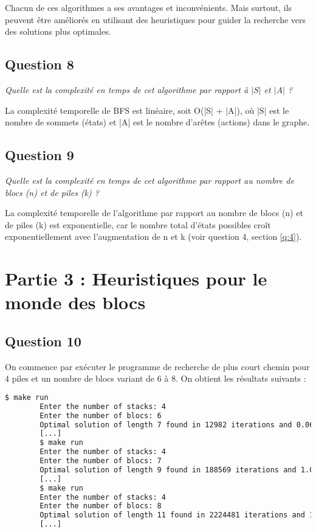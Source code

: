 Chacun de ces algorithmes a ses avantages et inconvénients. Mais surtout, ils peuvent être améliorés en utilisant des heuristiques pour guider la recherche vers des solutions plus optimales.

\subsection{Question 8}

\textit{Quelle est la complexité en temps de cet algorithme par rapport à $|S|$ et $|A|$ ?}

La complexité temporelle de BFS est linéaire, soit O(|S| + |A|), où |S| est le nombre de sommets (états) et |A| est le nombre d'arêtes (actions) dans le graphe.

\subsection{Question 9}

\textit{Quelle est la complexité en temps de cet algorithme par rapport au nombre de blocs (n) et de piles (k) ?}

La complexité temporelle de l'algorithme par rapport au nombre de blocs (n) et de piles (k) est exponentielle, car le nombre total d'états possibles croît exponentiellement avec l'augmentation de n et k (voir question 4, section \ref{q:4}).

\section{Partie 3 : Heuristiques pour le monde des blocs}

\subsection{Question 10}

On commence par exécuter le programme de recherche de plus court chemin pour 4 piles et un nombre de blocs variant de 6 à 8. On obtient les résultats suivants :

\begin{minipage}{\dimexpr\linewidth-20pt}
    \begin{lstlisting}[language=bash, caption={Résultats de l'exécution du programme de recherche de plus court chemin}, label={lst:plus_court_chemin_results_no_heuristics}]
        $ make run
        Enter the number of stacks: 4
        Enter the number of blocs: 6
        Optimal solution of length 7 found in 12982 iterations and 0.060902 seconds
        [...]
        $ make run
        Enter the number of stacks: 4
        Enter the number of blocs: 7
        Optimal solution of length 9 found in 188569 iterations and 1.04769 seconds
        [...]
        $ make run
        Enter the number of stacks: 4
        Enter the number of blocs: 8
        Optimal solution of length 11 found in 2224481 iterations and 15.6446 seconds
        [...]
    \end{lstlisting}
\end{minipage}

